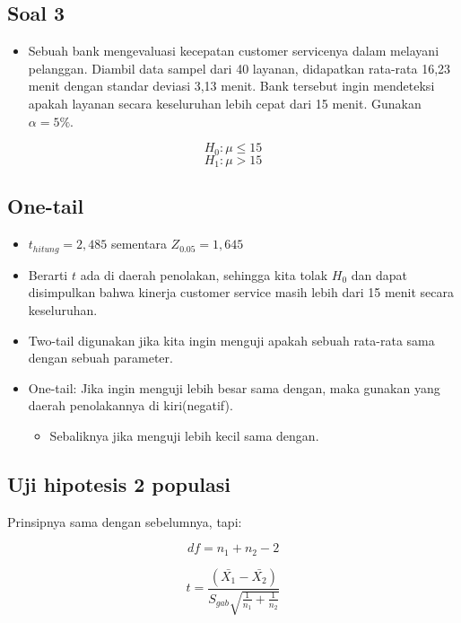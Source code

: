 \documentclass[
  letterpaper,
  DIV=11,
  numbers=noendperiod]{scrartcl}
\providecommand{\tightlist}{%
  \setlength{\itemsep}{0pt}\setlength{\parskip}{0pt}}\usepackage{longtable,booktabs,array}
\begin{document}
\subsection{Soal 3}\label{soal-3}

\begin{itemize}
\tightlist
\item
  Sebuah bank mengevaluasi kecepatan customer servicenya dalam melayani
  pelanggan. Diambil data sampel dari 40 layanan, didapatkan rata-rata
  16,23 menit dengan standar deviasi 3,13 menit. Bank tersebut ingin
  mendeteksi apakah layanan secara keseluruhan lebih cepat dari 15
  menit. Gunakan \(\alpha=5\%\).
\end{itemize}

\[
H_0: \mu\leq15
\] \[
H_1: \mu>15
\]

\subsection{One-tail}\label{one-tail}

\begin{itemize}
\item
  \(t_{hitung}=2,485\) sementara \(Z_{0.05}=1,645\)
\item
  Berarti \(t\) ada di daerah penolakan, sehingga kita tolak \(H_0\) dan
  dapat disimpulkan bahwa kinerja customer service masih lebih dari 15
  menit secara keseluruhan.
\item
  Two-tail digunakan jika kita ingin menguji apakah sebuah rata-rata
  sama dengan sebuah parameter.
\item
  One-tail: Jika ingin menguji lebih besar sama dengan, maka gunakan
  yang daerah penolakannya di kiri(negatif).

  \begin{itemize}
  \tightlist
  \item
    Sebaliknya jika menguji lebih kecil sama dengan.
  \end{itemize}
\end{itemize}

\subsection{Uji hipotesis 2 populasi}\label{uji-hipotesis-2-populasi}

Prinsipnya sama dengan sebelumnya, tapi:

\[
df=n_1+n_2-2
\]

\[
t=\frac{(\bar{X_1}-\bar{X_2})}{S_{gab}\sqrt{\frac{1}{n_1}+\frac{1}{n_2}}}
\]
\end{document}
